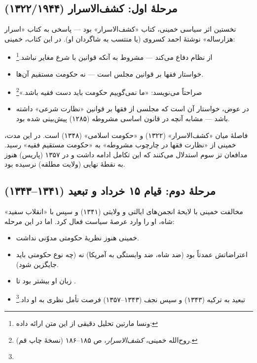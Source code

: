 \subsection{مرحلهٔ اول: کشف‌الاسرار (۱۳۲۲/۱۹۴۴)}

نخستین اثر سیاسی خمینی، کتاب «کشف‌الاسرار» بود — پاسخی به کتاب «اسرار هزارساله» نوشتهٔ احمد کسروی (یا منتسب به شاگردان او). در این کتاب، خمینی:

\begin{itemize}[label=\textcolor{cGold}{$\bullet$}, rightmargin=2em]
    \item از نظام  دفاع می‌کند — مشروط به آنکه قوانین با شرع مغایر نباشد.\footnote{ونسا مارتین تحلیل دقیقی از این متن ارائه داده: }
    \item خواستار  فقها بر قوانین مجلس است — نه حکومت مستقیم آن‌ها.
    \item صراحتاً می‌نویسد: «ما نمی‌گوییم حکومت باید دست فقیه باشد.»\footnote{روح‌الله خمینی، \textit{کشف‌الاسرار}، ص ۱۸۵–۱۸۶ (نسخهٔ چاپ قم).}
    \item در عوض، خواستار آن است که مجلسی از فقها بر قوانین «نظارت شرعی» داشته باشد — مشابه آنچه در قانون اساسی مشروطه (۱۲۸۵) پیش‌بینی شده بود.
\end{itemize}

\begin{noteBox}
فاصلهٔ میان «کشف‌الاسرار» (۱۳۲۲) و «حکومت اسلامی» (۱۳۴۸)  است. در این مدت، خمینی از «نظارت فقها در چارچوب مشروطه» به «حکومت مستقیم فقیه» رسید. مدافعان تز سوم استدلال می‌کنند که این تکامل ادامه داشت و در ۱۳۵۷ (پاریس) هنوز به نقطهٔ نهایی (ولایت مطلقه) نرسیده بود.
\end{noteBox}

\subsection{مرحلهٔ دوم: قیام ۱۵ خرداد و تبعید (۱۳۴۱–۱۳۴۳)}

مخالفت خمینی با لایحهٔ انجمن‌های ایالتی و ولایتی (۱۳۴۱) و سپس با «انقلاب سفید» شاه، او را وارد عرصهٔ سیاست فعال کرد. اما در این مرحله:

\begin{itemize}[label=\textcolor{cPrimary}{$\blacktriangleright$}, rightmargin=2em]
    \item خمینی هنوز نظریهٔ حکومتی مدوّنی نداشت.
    \item اعتراضاتش عمدتاً  بود (ضد شاه، ضد وابستگی به آمریکا) نه  (چه نوع حکومتی باید جایگزین شود).
    \item زبان او بیشتر  بود تا .
    \item تبعید به ترکیه (۱۳۴۳) و سپس نجف (۱۳۴۳–۱۳۵۷) فرصت تأمل نظری به او داد.\footnote{}
\end{itemize}

